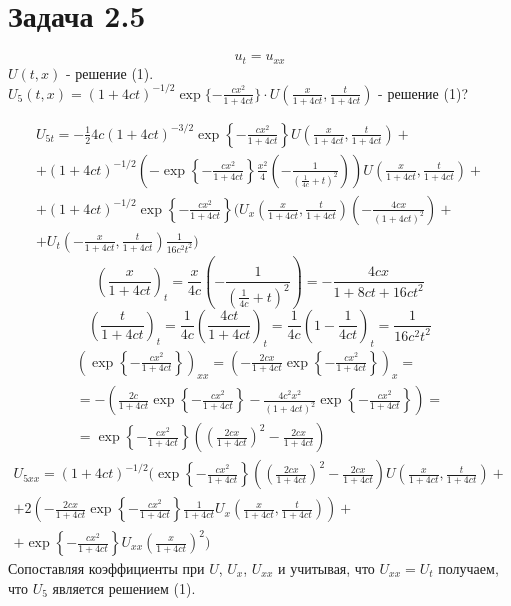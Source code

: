 \documentclass[11pt]{article}
\author{Sergey Makarov}
\date{\today}
\title{}
\begin{document}
\section{Задача 2.5}
\label{sec:orgd769ad6}
\begin{equation}
u_t = u_{xx}
\end{equation}
$U(t, x)$ - решение (1). $U_5(t, x) = (1 + 4ct)^{-1/2}\exp\{-\frac{cx^2}{1 + 4ct}\}\cdot U\left(\frac{x}{1 + 4ct}, \frac{t}{1 + 4ct}\right)$ - решение (1)?

\begin{multline}
U_{5t} = -\frac124c(1 + 4ct)^{-3/2}\exp\left\{-\frac{cx^2}{1 + 4ct}\right\}U\left(\frac{x}{1 + 4ct}, \frac{t}{1 + 4ct}\right) + \\
+ (1 + 4ct)^{-1/2}\left(-\exp\left\{-\frac{cx^2}{1 + 4ct}\right\}\frac{x^2}4\left(-\frac1{\left(\frac1{4c} + t\right)^2}\right)\right)U\left(\frac{x}{1 + 4ct}, \frac{t}{1 + 4ct}\right) + \\
+ (1 + 4ct)^{-1/2}\exp\left\{-\frac{cx^2}{1 + 4ct}\right\}(U_x\left(\frac{x}{1 + 4ct}, \frac{t}{1 + 4ct}\right)\left(-\frac{4cx}{(1 + 4ct)^2}\right) + \\
+ U_t\left(-\frac{x}{1 + 4ct}, \frac{t}{1 + 4ct}\right)\frac1{16c^2t^2})
\end{multline}
\begin{equation*}
\left(\frac{x}{1 + 4ct}\right)_t = \frac{x}{4c}\left(-\frac1{\left(\frac1{4c} + t\right)^2}\right) =
-\frac{4cx}{1 + 8ct + 16ct^2}
\end{equation*}
\begin{equation*}
\left(\frac{t}{1 + 4ct}\right)_t = \frac1{4c}\left(\frac{4ct}{1 + 4ct}\right)_t = \frac1{4c}\left(1 - \frac1{4ct}\right)_t = \frac1{16c^2t^2}
\end{equation*}
\begin{multline*}
\left(\exp\left\{-\frac{cx^2}{1 + 4ct}\right\}\right)_{xx} = \left(-\frac{2cx}{1 + 4ct}\exp\left\{-\frac{cx^2}{1 + 4ct}\right\}\right)_x = \\
= -\left(\frac{2c}{1 + 4ct}\exp\left\{-\frac{cx^2}{1 + 4ct}\right\} - \frac{4c^2x^2}{(1 + 4ct)^2}\exp\left\{-\frac{cx^2}{1 + 4ct}\right\}\right) = \\
= \exp\left\{-\frac{cx^2}{1 + 4ct}\right\}\left(\left(\frac{2cx}{1 + 4ct}\right)^2 - \frac{2cx}{1 + 4ct}\right)
\end{multline*}
\begin{multline}
U_{5xx} = (1 + 4ct)^{-1/2}(\exp\left\{-\frac{cx^2}{1 + 4ct}\right\}\left(\left(\frac{2cx}{1 + 4ct}\right)^2 - \frac{2cx}{1 + 4ct}\right)
U\left(\frac{x}{1 + 4ct}, \frac{t}{1 + 4ct}\right) + \\
+ 2\left(-\frac{2cx}{1 + 4ct}\exp\left\{-\frac{cx^2}{1 + 4ct}\right\}\frac1{1 + 4ct}U_x\left(\frac{x}{1 + 4ct}, \frac{t}{1 + 4ct}\right)\right) + \\
+ \exp\left\{-\frac{cx^2}{1 + 4ct}\right\}U_{xx}\left(\frac{x}{1 + 4ct}\right)^2)
\end{multline}
Сопоставляя коэффициенты при $U$, $U_x$, $U_{xx}$ и учитывая, что $U_{xx} = U_t$ получаем, что $U_5$
является решением (1).
\end{document}
